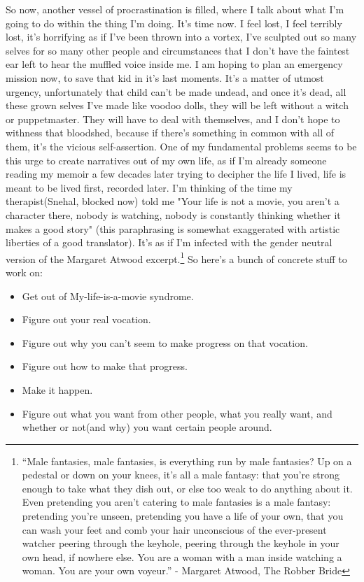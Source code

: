 So now, another vessel of procrastination is filled, where I talk about what I'm going to do within the thing I'm doing. It's time now. I feel lost, I feel terribly lost, it's horrifying as if I've been thrown into a vortex, I've sculpted out so many selves for so many other people and circumstances that I don't have the faintest ear left to hear the muffled voice inside me. I am hoping to plan an emergency mission now, to save that kid in it's last moments. It's a matter of utmost urgency, unfortunately that child can't be made undead, and once it's dead, all these grown selves I've made like voodoo dolls, they will be left without a witch or puppetmaster. They will have to deal with themselves, and I don't hope to withness that bloodshed, because if there's something in common with all of them, it's the vicious self-assertion. One of my fundamental problems seems to be this urge to create narratives out of my own life, as if I'm already someone reading my memoir a few decades later trying to decipher the life I lived, life is meant to be lived first, recorded later. I'm thinking of the time my therapist(Snehal, blocked now) told me "Your life is not a movie, you aren't a character there, nobody is watching, nobody is constantly thinking whether it makes a good story" (this paraphrasing is somewhat exaggerated with artistic liberties of a good translator). It's as if I'm infected with the gender neutral version of the Margaret Atwood excerpt.\footnote{ “Male fantasies, male fantasies, is everything run by male fantasies? Up on a pedestal or down on your knees, it's all a male fantasy: that you're strong enough to take what they dish out, or else too weak to do anything about it. Even pretending you aren't catering to male fantasies is a male fantasy: pretending you're unseen, pretending you have a life of your own, that you can wash your feet and comb your hair unconscious of the ever-present watcher peering through the keyhole, peering through the keyhole in your own head, if nowhere else. You are a woman with a man inside watching a woman. You are your own voyeur.” -  Margaret Atwood, The Robber Bride } So here's a bunch of concrete stuff to work on:
\begin{itemize}
    \item Get out of My-life-is-a-movie syndrome.
    \item Figure out your real vocation.
    \item Figure out why you can't seem to make progress on that vocation.
    \item Figure out how to make that progress.
    \item Make it happen.
    \item Figure out what you want from other people, what you really want, and whether or not(and why) you want certain people around.
\end{itemize}

